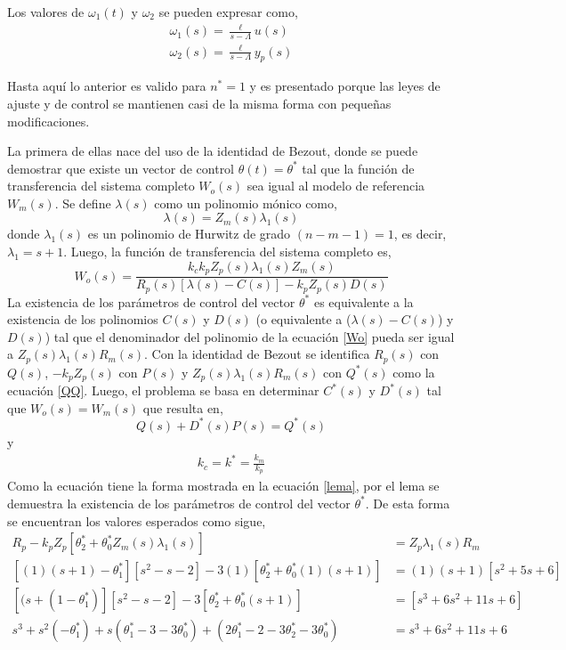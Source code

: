 \documentclass[letterpaper,11pt]{article} %
\begin{document}
Los valores de $\omega_1(t)$ y $\omega_2$ se pueden expresar como,
\begin{align}
	\omega_1(s) = \frac{\ell}{s - \Lambda} u(s) \nonumber \\
	\omega_2(s) = \frac{\ell}{s - \Lambda} y_p(s)
\end{align}

Hasta aquí lo anterior es valido para $n^*=1$ y es presentado porque las leyes de ajuste y de control se mantienen casi de la misma forma con pequeñas modificaciones.   

La primera de ellas nace del uso de la identidad de Bezout, donde se puede demostrar que existe un vector de control $\theta(t) = \theta^*$ tal que la función de transferencia del sistema completo $W_o(s)$ sea igual al modelo de referencia $W_m(s)$. Se define $\lambda(s)$ como un polinomio mónico como,
\begin{equation}
\lambda(s) = Z_m(s)\lambda_1(s)
\end{equation}
donde $\lambda_1(s)$ es un polinomio de Hurwitz de grado $(n-m-1)=1$, es decir, $\lambda_1 = s+1$. Luego, la función de transferencia del sistema completo es,
\begin{equation}
	W_o(s) = \frac{k_c k_p Z_p(s) \lambda_1(s) Z_m(s)}{R_p(s)[\lambda(s) - C(s)] - k_p Z_p(s) D(s)}	
\label{Wo}
\end{equation}
La existencia de los parámetros de control del vector $\theta^*$ es equivalente a la existencia de los polinomios $C(s)$ y $D(s)$ (o equivalente a ($\lambda(s) - C(s)$) y $D(s)$) tal que el denominador del polinomio de la ecuación \eqref{Wo} pueda ser igual a $Z_p(s)\lambda_1(s)R_m(s)$. Con la identidad de Bezout se identifica $R_p(s)$ con $Q(s)$, $-k_p Z_p(s) $ con $P(s)$ y $Z_p(s) \lambda_1(s)R_m(s)$ con $Q^*(s)$ como la ecuación \eqref{QQ}. Luego, el problema se basa en determinar $C^*(s)$ y $D^*(s)$ tal que $W_o(s) = W_m(s)$ que resulta en,
\begin{equation}
	[\lambda(s) - C^*(s)]Q(s) + D^*(s) P(s) = Q^*(s)
\end{equation}
y 
\begin{align}
k_c = k^* = \frac{k_m}{k_p}
\end{align}
Como la ecuación tiene la forma mostrada en la ecuación \eqref{lema}, por el lema se demuestra la existencia de los parámetros de control del vector $\theta^*$. De esta forma se encuentran los valores esperados como sigue,
\begin{align}
[Z_m(s)\lambda_1(s) - \theta_1^*]R_p - k_p Z_p[\theta_2^* + \theta_0^* Z_m(s)\lambda_1(s)] &= Z_p \lambda_1(s) R_m \nonumber \\
[(1)(s + 1) - \theta_1^*] [s^2 - s - 2] - 3 (1)[\theta_2^* + \theta_0^* (1)(s + 1)] &= (1) (s + 1) [s^2 + 5s + 6]\nonumber \\
[(s + (1 - \theta_1^*)] [s^2 - s - 2] - 3[\theta_2^* + \theta_0^*(s + 1)] &= [s^3 + 6s^2 + 11s + 6]\nonumber \\
s^3 + s^2(-\theta_1^*) + s(\theta_1^* -3 - 3\theta_0^*) + (2\theta_1^* - 2 - 3\theta_2^* - 3\theta_0^*) &= s^3 + 6s^2 + 11s + 6
\end{align}
\end{document}
